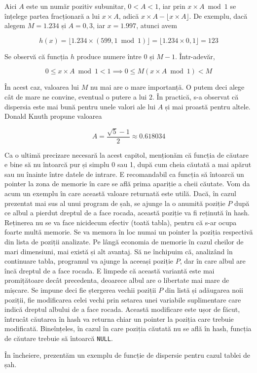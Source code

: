 Aici $A$ este un număr pozitiv subunitar, $0 < A < 1$, iar prin $x \times A
\bmod 1$ se înțelege partea fracționară a lui $x \times A$, adică $x \times A
- \lfloor x \times A \rfloor$. De exemplu, dacă alegem $M = 1.234$ și $A =
0,3$, iar $x = 1.997$, atunci avem

\begin{equation}
  h(x) = \lfloor 1.234 \times (599,1 \bmod 1) \rfloor = \lfloor 1.234 \times 0,1 \rfloor = 123
\end{equation}

Se observă că funcția $h$ produce numere între 0 și $M-1$. Într-adevăr, 

\begin{equation}
  0 \leq x \times A \bmod 1 < 1 \implies 0 \leq M(x \times A \bmod 1) < M
\end{equation}

În acest caz, valoarea lui $M$ nu mai are o mare importanță. O putem deci
alege cât de mare ne convine, eventual o putere a lui 2. În practică, s-a
observat că dispersia este mai bună pentru unele valori ale lui $A$ și mai
proastă pentru altele. Donald Knuth propune valoarea

\begin{equation}
  A = \frac{\sqrt{5} - 1}{2} \approx 0.618034
\end{equation}

Ca o ultimă precizare necesară la acest capitol, menționăm că funcția de
căutare e bine să nu întoarcă pur și simplu 0 sau 1, după cum cheia căutată a
mai apărut sau nu înainte între datele de intrare. E recomandabil ca funcția
să întoarcă un pointer la zona de memorie în care se află prima apariție a
cheii căutate. Vom da acum un exemplu în care această valoare returnată este
utilă. Dacă, în cazul prezentat mai sus al unui program de șah, se ajunge la o
anumită poziție $P$ după ce albul a pierdut dreptul de a face rocada, această
poziție va fi reținută în hash. Reținerea nu se va face nicidecum efectiv
(toată tabla), pentru că s-ar ocupa foarte multă memorie. Se va memora în loc
numai un pointer la poziția respectivă din lista de poziții analizate. Pe
lângă economia de memorie în cazul cheilor de mari dimensiuni, mai există și
alt avantaj. Să ne închipuim că, analizând în continuare tabla, programul va
ajunge la aceeași poziție $P$, dar în care albul are încă dreptul de a face
rocada. E limpede că această variantă este mai promițătoare decât precedenta,
deoarece albul are o libertate mai mare de mișcare. Se impune deci fie
ștergerea vechii poziții $P$ din listă și adăugarea noii poziții, fie
modificarea celei vechi prin setarea unei variabile suplimentare care indică
dreptul albului de a face rocada. Această modificare este ușor de făcut,
întrucât căutarea în hash va returna chiar un pointer la poziția care trebuie
modificată. Bineînțeles, în cazul în care poziția căutată nu se află în hash,
funcția de căutare trebuie să întoarcă {\tt NULL}.

În încheiere, prezentăm un exemplu de funcție de dispersie pentru cazul tablei
de șah.

\inputminted{c}{src/chapter4-4.c}
